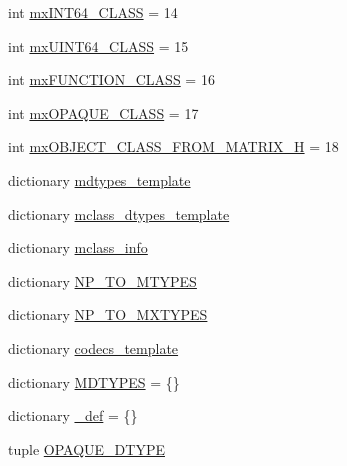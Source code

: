 \begin{DoxyCompactItemize}
int \hyperlink{namespacescipy_1_1io_1_1matlab_1_1mio5__params_adc2e5707ee89ed17e7c8c6fb12b65379}{mx\+I\+N\+T64\+\_\+\+C\+L\+A\+S\+S} = 14
\item 
int \hyperlink{namespacescipy_1_1io_1_1matlab_1_1mio5__params_a2446a4b0b33ff71d57be9a02cd016af5}{mx\+U\+I\+N\+T64\+\_\+\+C\+L\+A\+S\+S} = 15
\item 
int \hyperlink{namespacescipy_1_1io_1_1matlab_1_1mio5__params_a38a056cf76b5d1c466ecc72353e6c0a1}{mx\+F\+U\+N\+C\+T\+I\+O\+N\+\_\+\+C\+L\+A\+S\+S} = 16
\item 
int \hyperlink{namespacescipy_1_1io_1_1matlab_1_1mio5__params_a60f14045cb8ce738c94cc3f7dd28c478}{mx\+O\+P\+A\+Q\+U\+E\+\_\+\+C\+L\+A\+S\+S} = 17
\item 
int \hyperlink{namespacescipy_1_1io_1_1matlab_1_1mio5__params_a3369194a2e3c8e2ca6d3a72ba9315fe7}{mx\+O\+B\+J\+E\+C\+T\+\_\+\+C\+L\+A\+S\+S\+\_\+\+F\+R\+O\+M\+\_\+\+M\+A\+T\+R\+I\+X\+\_\+\+H} = 18
\item 
dictionary \hyperlink{namespacescipy_1_1io_1_1matlab_1_1mio5__params_a155ba11a55a9e662d4dfae9ffb1763e1}{mdtypes\+\_\+template}
\item 
dictionary \hyperlink{namespacescipy_1_1io_1_1matlab_1_1mio5__params_a9357fae402de167deba8baced179d6dc}{mclass\+\_\+dtypes\+\_\+template}
\item 
dictionary \hyperlink{namespacescipy_1_1io_1_1matlab_1_1mio5__params_af9b5207c0daee91d419d4774a7ad36e5}{mclass\+\_\+info}
\item 
dictionary \hyperlink{namespacescipy_1_1io_1_1matlab_1_1mio5__params_ac11e31b9c520336e9b1fac3650302094}{N\+P\+\_\+\+T\+O\+\_\+\+M\+T\+Y\+P\+E\+S}
\item 
dictionary \hyperlink{namespacescipy_1_1io_1_1matlab_1_1mio5__params_aaeddecfc026604340fa79525ea8423b6}{N\+P\+\_\+\+T\+O\+\_\+\+M\+X\+T\+Y\+P\+E\+S}
\item 
dictionary \hyperlink{namespacescipy_1_1io_1_1matlab_1_1mio5__params_a9f5430938191f6465d951eec1014c1cf}{codecs\+\_\+template}
\item 
dictionary \hyperlink{namespacescipy_1_1io_1_1matlab_1_1mio5__params_a116bbcaa432cfa9a2291e1985d33f97f}{M\+D\+T\+Y\+P\+E\+S} = \{\}
\item 
dictionary \hyperlink{namespacescipy_1_1io_1_1matlab_1_1mio5__params_a7128d54c31e45411986e68f445610b53}{\+\_\+def} = \{\}
\item 
tuple \hyperlink{namespacescipy_1_1io_1_1matlab_1_1mio5__params_acd6cd0bfb7292dc26428e3d1bc83d3a9}{O\+P\+A\+Q\+U\+E\+\_\+\+D\+T\+Y\+P\+E}
\end{DoxyCompactItemize}


